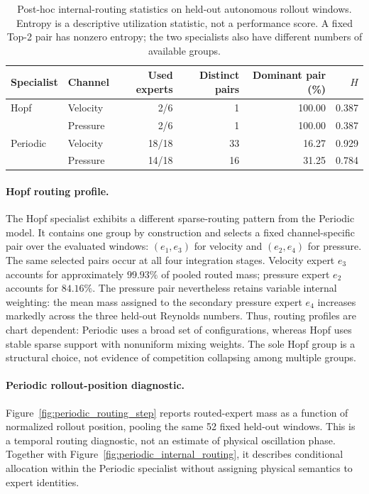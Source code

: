 \begin{table}[htbp]
\centering
\caption{Post-hoc internal-routing statistics on held-out autonomous rollout
windows. Entropy is a descriptive utilization statistic, not a performance
score. A fixed Top-2 pair has nonzero entropy; the two specialists also have
different numbers of available groups.}
\label{tab:internal_routing_summary}
\small
\setlength{\tabcolsep}{5pt}
\begin{tabular}{@{}llrrrr@{}}
\toprule
Specialist & Channel & Used experts & Distinct pairs & Dominant pair (\%) & $H$ \\
\midrule
Hopf & Velocity & 2/6 & 1 & 100.00 & 0.387 \\
     & Pressure & 2/6 & 1 & 100.00 & 0.387 \\
\addlinespace
Periodic & Velocity & 18/18 & 33 & 16.27 & 0.929 \\
         & Pressure & 14/18 & 16 & 31.25 & 0.784 \\
\bottomrule
\end{tabular}
\end{table}

\paragraph{Hopf routing profile.}
The Hopf specialist exhibits a different sparse-routing pattern from the
Periodic model. It contains one group by construction and selects a fixed
channel-specific pair over the evaluated windows: $(e_1,e_3)$ for velocity
and $(e_2,e_4)$ for pressure. The same selected pairs occur at all four
integration stages. Velocity expert $e_3$ accounts for approximately
$99.93\%$ of pooled routed mass; pressure expert $e_2$ accounts for
$84.16\%$. The pressure pair nevertheless retains variable internal
weighting: the mean mass assigned to the secondary pressure expert $e_4$
increases markedly across the three held-out Reynolds numbers.
Thus, routing profiles are chart dependent: Periodic uses a broad set of
configurations, whereas Hopf uses stable sparse support with nonuniform
mixing weights. The sole Hopf group is a structural choice, not evidence of
competition collapsing among multiple groups.

\paragraph{Periodic rollout-position diagnostic.}
Figure~\ref{fig:periodic_routing_step} reports routed-expert mass as a function
of normalized rollout position, pooling the same 52 fixed held-out windows.
This is a temporal routing diagnostic, not an estimate of physical oscillation
phase. Together with Figure~\ref{fig:periodic_internal_routing}, it describes
conditional allocation within the Periodic specialist without assigning
physical semantics to expert identities.

